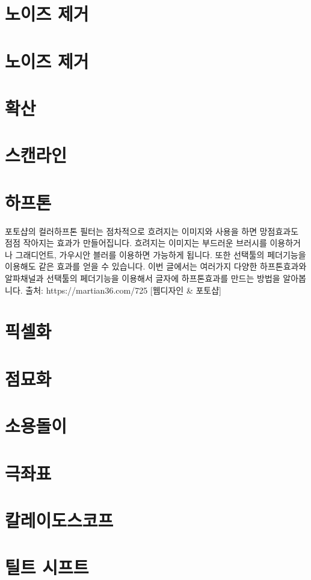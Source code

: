 \documentclass[12pt, a4paper, oneside]{book}
\let\stdsection\section
\renewcommand\section{\newpage\stdsection}
\begin{document}
\section{	노이즈 제거				}							
\section{	노이즈 제거				}							
\section{	확산				}							
\section{	스캔라인				}							
\section{	하프톤				}
포토샵의 컬러하프톤 필터는 점차적으로 흐려지는 이미지와 사용을 하면 망점효과도 점점 작아지는 효과가 만들어집니다. 
흐려지는 이미지는 부드러운 브러시를 이용하거나 그래디언트, 가우시안 블러를 이용하면 가능하게 됩니다. 
또한 선택툴의 페더기능을 이용해도 같은 효과를 얻을 수 있습니다. 
이번 글에서는 여러가지 다양한 하프톤효과와 알파채널과 선택툴의 페더기능을 이용해서 글자에 하프톤효과를 만드는 방법을 알아봅니다. 
출처: https://martian36.com/725 [웹디자인 \& 포토샵]


\section{	픽셀화				}					
\section{	점묘화				}							
\section{	소용돌이				}							
\section{	극좌표				}							
\section{	칼레이도스코프				}							
\section{	틸트 시프트				}							
\end{document}
